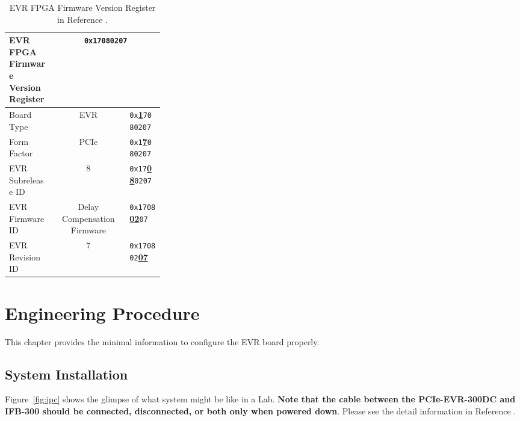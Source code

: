 \documentclass[11pt
  , a4paper
  , article
  , oneside
  , showtrims
]{memoir}
\begin{document}
\begin{table}[!htb]
  \centering
  \begin{tabular}{p{0.3\linewidth}|c|l}
    \toprule
    EVR FPGA Firmware Version Register              & \multicolumn{2}{c}{\texttt{0x17080207}}             \\\midrule
    Board Type        & EVR                         &  \texttt{0x}\underline{\textbf{1}}\texttt{7080207}  \\\midrule
    Form Factor       & PCIe                        &  \texttt{0x1}\underline{\textbf{7}}\texttt{080207}  \\\midrule
    EVR Subrelease ID & 8                           &  \texttt{0x17}\underline{\textbf{08}}\texttt{0207}  \\\midrule
    EVR Firmware ID   & Delay Compensation Firmware &  \texttt{0x1708}\underline{\textbf{02}}\texttt{07}  \\\midrule
    EVR Revision ID   & 7                           &  \texttt{0x170802}\underline{\textbf{07}}           \\\bottomrule
  \end{tabular}
  \caption[]{EVR FPGA Firmware Version Register in Reference \citep[see][p66]{MRFEVENTSYSTEMDC}.}
  \label{table:fwinfo}
\end{table}


\clearpage
\chapter{Engineering Procedure}
This chapter provides the minimal information to configure the EVR board properly.

\section{System Installation}
Figure~\ref{fig:ipc} shows the glimpse of what system might be like in a Lab. \textbf{Note that the cable between the PCIe-EVR-300DC and IFB-300 should be connected, disconnected, or both only when powered down}. Please see the detail information in Reference \citep[][p54]{MRFEVENTSYSTEMDC}.
\end{document}
